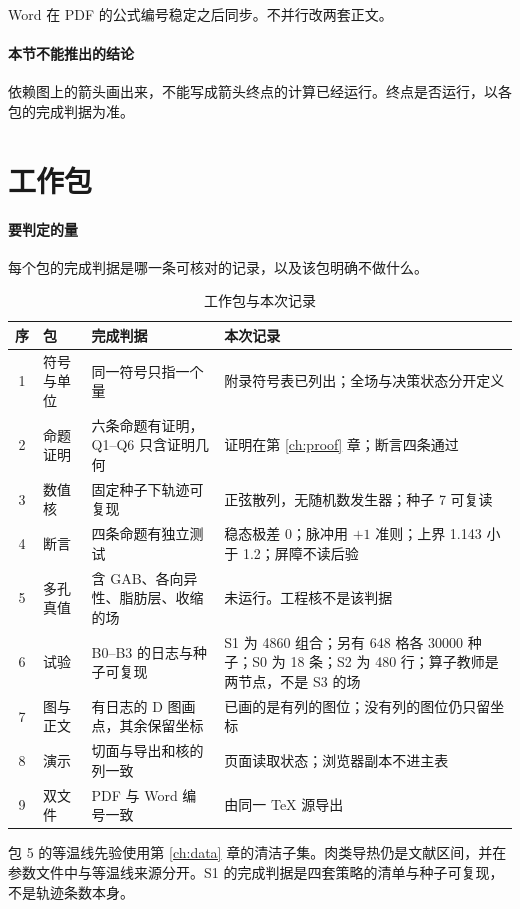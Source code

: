 Word 在 PDF 的公式编号稳定之后同步。不并行改两套正文。

\paragraph{本节不能推出的结论}
依赖图上的箭头画出来，不能写成箭头终点的计算已经运行。终点是否运行，以各包的完成判据为准。

\section{工作包}

\paragraph{要判定的量}
每个包的完成判据是哪一条可核对的记录，以及该包明确不做什么。

\begin{table}[ht]
\centering
\caption{工作包与本次记录}
\begin{tabularx}{\textwidth}{clXX}
\toprule
序 & 包 & 完成判据 & 本次记录 \\
\midrule
1 & 符号与单位 & 同一符号只指一个量 & 附录符号表已列出；全场与决策状态分开定义 \\
2 & 命题证明 & 六条命题有证明，Q1--Q6 只含证明几何 & 证明在第 \ref{ch:proof} 章；断言四条通过 \\
3 & 数值核 & 固定种子下轨迹可复现 & 正弦散列，无随机数发生器；种子 7 可复读 \\
4 & 断言 & 四条命题有独立测试 & 稳态极差 0；脉冲用 \(+1\) 准则；上界 1.143 小于 1.2；屏障不读后验 \\
5 & 多孔真值 & 含 GAB、各向异性、脂肪层、收缩的场 & 未运行。工程核不是该判据 \\
6 & 试验 & B0--B3 的日志与种子可复现 & S1 为 4860 组合；另有 648 格各 30000 种子；S0 为 18 条；S2 为 480 行；算子教师是两节点，不是 S3 的场 \\
7 & 图与正文 & 有日志的 D 图画点，其余保留坐标 & 已画的是有列的图位；没有列的图位仍只留坐标 \\
8 & 演示 & 切面与导出和核的列一致 & 页面读取状态；浏览器副本不进主表 \\
9 & 双文件 & PDF 与 Word 编号一致 & 由同一 TeX 源导出 \\
\bottomrule
\end{tabularx}
\end{table}

包 5 的等温线先验使用第 \ref{ch:data} 章的清洁子集。肉类导热仍是文献区间，并在参数文件中与等温线来源分开。S1 的完成判据是四套策略的清单与种子可复现，不是轨迹条数本身。

